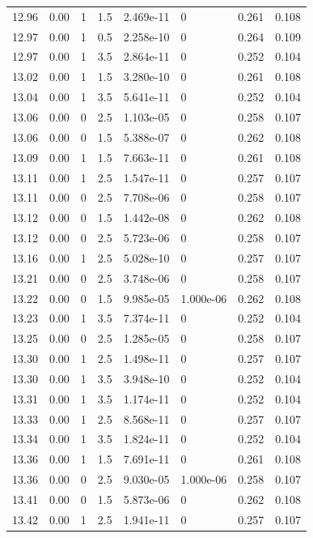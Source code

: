 \documentclass[preview]{standalone}
\begin{document}
{{{{{{{{{{\begin{tabular}{L{1.2cm}C{1.2cm} C{0.3cm}C{0.5cm} C{1.4cm}C{1.4cm} C{1.4cm}C{1.4cm}}
  12.96  &  0.00  & 1     & 1.5 &  2.469e-11  & 0  & 0.261 &  0.108   \\ 
  12.97  &  0.00  & 1     & 0.5 &  2.258e-10  & 0  & 0.264 &  0.109   \\ 
  12.97  &  0.00  & 1     & 3.5 &  2.864e-11  & 0  & 0.252 &  0.104   \\ 
  13.02  &  0.00  & 1     & 1.5 &  3.280e-10  & 0  & 0.261 &  0.108   \\ 
  13.04  &  0.00  & 1     & 3.5 &  5.641e-11  & 0  & 0.252 &  0.104   \\ 
  13.06  &  0.00  & 0     & 2.5 &  1.103e-05  & 0  & 0.258 &  0.107   \\ 
  13.06  &  0.00  & 0     & 1.5 &  5.388e-07  & 0  & 0.262 &  0.108   \\ 
  13.09  &  0.00  & 1     & 1.5 &  7.663e-11  & 0  & 0.261 &  0.108   \\ 
  13.11  &  0.00  & 1     & 2.5 &  1.547e-11  & 0  & 0.257 &  0.107   \\ 
  13.11  &  0.00  & 0     & 2.5 &  7.708e-06  & 0  & 0.258 &  0.107   \\ 
  13.12  &  0.00  & 0     & 1.5 &  1.442e-08  & 0  & 0.262 &  0.108   \\ 
  13.12  &  0.00  & 0     & 2.5 &  5.723e-06  & 0  & 0.258 &  0.107   \\ 
  13.16  &  0.00  & 1     & 2.5 &  5.028e-10  & 0  & 0.257 &  0.107   \\ 
  13.21  &  0.00  & 0     & 2.5 &  3.748e-06  & 0  & 0.258 &  0.107   \\ 
  13.22  &  0.00  & 0     & 1.5 &  9.985e-05  & 1.000e-06  & 0.262 &  0.108   \\ 
  13.23  &  0.00  & 1     & 3.5 &  7.374e-11  & 0  & 0.252 &  0.104   \\ 
  13.25  &  0.00  & 0     & 2.5 &  1.285e-05  & 0  & 0.258 &  0.107   \\ 
  13.30  &  0.00  & 1     & 2.5 &  1.498e-11  & 0  & 0.257 &  0.107   \\ 
  13.30  &  0.00  & 1     & 3.5 &  3.948e-10  & 0  & 0.252 &  0.104   \\ 
  13.31  &  0.00  & 1     & 3.5 &  1.174e-11  & 0  & 0.252 &  0.104   \\ 
  13.33  &  0.00  & 1     & 2.5 &  8.568e-11  & 0  & 0.257 &  0.107   \\ 
  13.34  &  0.00  & 1     & 3.5 &  1.824e-11  & 0  & 0.252 &  0.104   \\ 
  13.36  &  0.00  & 1     & 1.5 &  7.691e-11  & 0  & 0.261 &  0.108   \\ 
  13.36  &  0.00  & 0     & 2.5 &  9.030e-05  & 1.000e-06  & 0.258 &  0.107   \\ 
  13.41  &  0.00  & 0     & 1.5 &  5.873e-06  & 0  & 0.262 &  0.108   \\ 
  13.42  &  0.00  & 1     & 2.5 &  1.941e-11  & 0  & 0.257 &  0.107   \\ 
\hline 
\end{tabular} 

}}}}}}}}}}
\end{document}
